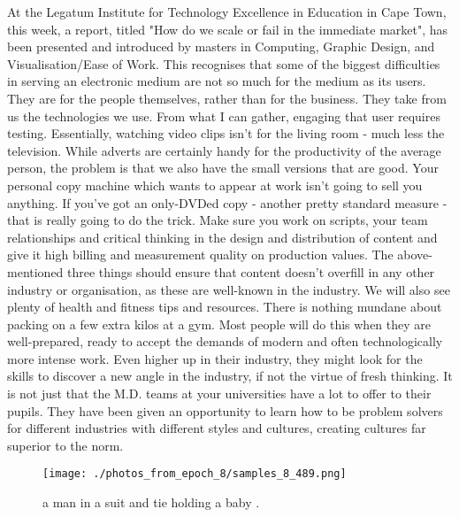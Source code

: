 \documentclass{article}%
\begin{document}
At the Legatum Institute for Technology Excellence in Education in Cape Town, this week, a report, titled "How do we scale or fail in the immediate market", has been presented and introduced by masters in Computing, Graphic Design, and Visualisation/Ease of Work.\newline%
This recognises that some of the biggest difficulties in serving an electronic medium are not so much for the medium as its users. They are for the people themselves, rather than for the business. They take from us the technologies we use. From what I can gather, engaging that user requires testing.\newline%
Essentially, watching video clips isn't for the living room {-} much less the television. While adverts are certainly handy for the productivity of the average person, the problem is that we also have the small versions that are good. Your personal copy machine which wants to appear at work isn't going to sell you anything. If you've got an only{-}DVDed copy {-} another pretty standard measure {-} that is really going to do the trick.\newline%
Make sure you work on scripts, your team relationships and critical thinking in the design and distribution of content and give it high billing and measurement quality on production values. The above{-}mentioned three things should ensure that content doesn't overfill in any other industry or organisation, as these are well{-}known in the industry.\newline%
We will also see plenty of health and fitness tips and resources. There is nothing mundane about packing on a few extra kilos at a gym.\newline%
Most people will do this when they are well{-}prepared, ready to accept the demands of modern and often technologically more intense work. Even higher up in their industry, they might look for the skills to discover a new angle in the industry, if not the virtue of fresh thinking.\newline%
It is not just that the M.D. teams at your universities have a lot to offer to their pupils. They have been given an opportunity to learn how to be problem solvers for different industries with different styles and cultures, creating cultures far superior to the norm.\newline%

%


\begin{figure}[h!]%
\centering%
\texttt{[image: ./photos\_from\_epoch\_8/samples\_8\_489.png]}%
\caption{a man in a suit and tie holding a baby .}%
\end{figure}

%
\end{document}
